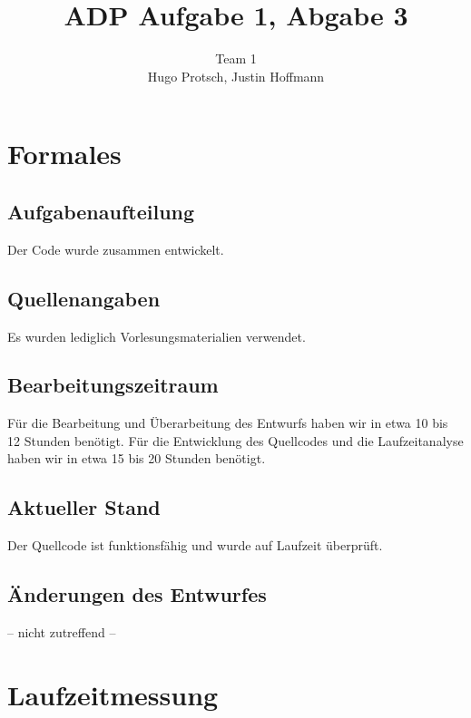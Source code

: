\documentclass[11pt]{article}
\title{ADP Aufgabe 1, Abgabe 3}
\author{Team 1\\Hugo Protsch, Justin Hoffmann}
\begin{document}
    \maketitle


    \section{Formales}\label{sec:Formales}


    \subsection{Aufgabenaufteilung}
    Der Code wurde zusammen entwickelt.

    \subsection{Quellenangaben}

    Es wurden lediglich Vorlesungsmaterialien verwendet.


    \subsection{Bearbeitungszeitraum}
    Für die Bearbeitung und Überarbeitung des Entwurfs haben wir in etwa 10 bis
    12 Stunden benötigt.
    Für die Entwicklung des Quellcodes und die Laufzeitanalyse haben wir in
    etwa 15 bis 20 Stunden benötigt.

    \subsection{Aktueller Stand}
    Der Quellcode ist funktionsfähig und wurde auf Laufzeit überprüft.


    \subsection{Änderungen des Entwurfes}
    -- nicht zutreffend --


    \section{Laufzeitmessung}\label{sec:laufzeitmessung}
\end{document}

